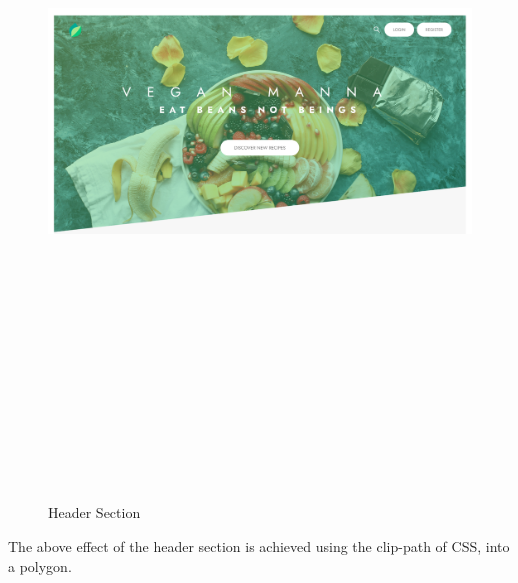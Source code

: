 \begin{figure}[!hb]
\centering
\caption[Header Section]{Header Section}%
\label{fig:header_section}
\includegraphics[width=\linewidth,height=20cm,keepaspectratio]{img/header_section}
\end{figure}

The above effect of the header section is achieved using the clip-path of CSS, into a polygon.


